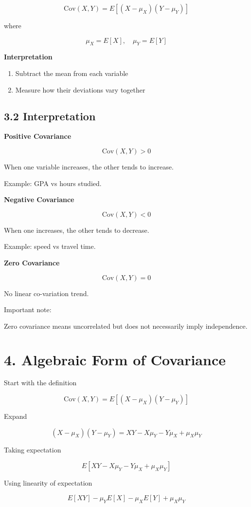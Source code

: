 \documentclass[12pt]{article}
\begin{document}
\[
\text{Cov}(X,Y)=E[(X-\mu_X)(Y-\mu_Y)]
\]

where

\[
\mu_X=E[X], \quad \mu_Y=E[Y]
\]

\textbf{Interpretation}

\begin{enumerate}
\item Subtract the mean from each variable
\item Measure how their deviations vary together
\end{enumerate}

\subsection*{3.2 Interpretation}

\textbf{Positive Covariance}

\[
\text{Cov}(X,Y) > 0
\]

When one variable increases, the other tends to increase.

Example: GPA vs hours studied.

\textbf{Negative Covariance}

\[
\text{Cov}(X,Y) < 0
\]

When one increases, the other tends to decrease.

Example: speed vs travel time.

\textbf{Zero Covariance}

\[
\text{Cov}(X,Y)=0
\]

No linear co-variation trend.

Important note:

Zero covariance means uncorrelated but does not necessarily imply independence.

\section*{4. Algebraic Form of Covariance}

Start with the definition

\[
\text{Cov}(X,Y)=E[(X-\mu_X)(Y-\mu_Y)]
\]

Expand

\[
(X-\mu_X)(Y-\mu_Y)=XY-X\mu_Y-Y\mu_X+\mu_X\mu_Y
\]

Taking expectation

\[
E[XY-X\mu_Y-Y\mu_X+\mu_X\mu_Y]
\]

Using linearity of expectation

\[
E[XY]-\mu_YE[X]-\mu_XE[Y]+\mu_X\mu_Y
\]
\end{document}
